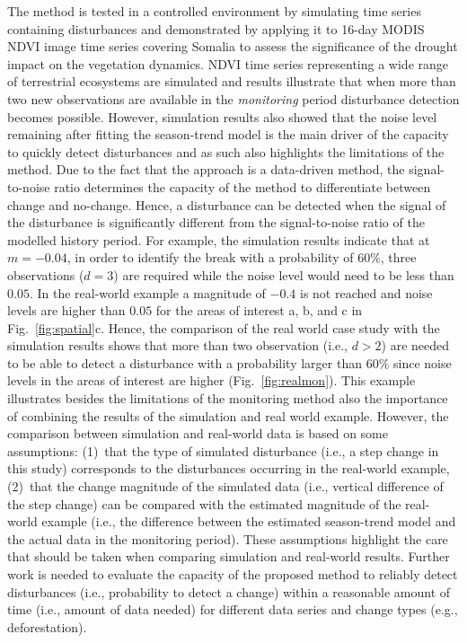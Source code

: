 \documentclass[authoryear,preprint,review,10pt]{elsarticle}
\begin{document}
The method is tested in a controlled environment by simulating time series containing disturbances and demonstrated by applying it to 16-day MODIS NDVI image
time series covering Somalia to assess the significance of the drought impact on the vegetation dynamics. NDVI time series representing a wide range of
terrestrial ecosystems are simulated and results illustrate that when more than two new observations are available in the \emph{monitoring} period
disturbance detection becomes possible. However, simulation results also showed that the noise level remaining after fitting the season-trend model is the
main driver of the capacity to quickly detect disturbances and as such also highlights the limitations of the method. Due to the fact that the approach is a
data-driven method, the signal-to-noise ratio determines the capacity of the method to differentiate between change and no-change. Hence, a disturbance can
be detected when the signal of the disturbance is significantly different from the signal-to-noise ratio of the modelled history period. For example, the
simulation results indicate that at $m = -0.04$, in order to identify the break with a probability of $60\%$, three observations ($d=3$) are required while
the noise level would need to be less than $0.05$. In the real-world example a magnitude of $-0.4$ is not reached and noise levels are higher than $0.05$ for
the areas of interest a, b, and c in Fig.~\ref{fig:spatial}c. Hence, the comparison of the real world case study with the simulation results shows that more
than two observation (i.e., $d>2$) are needed to be able to detect a disturbance with a probability larger than $60\%$ since noise levels in the areas of
interest are higher (Fig.~\ref{fig:realmon}).  This example illustrates besides the limitations of the monitoring method also the importance of combining the
results of the simulation and real world example. However, the comparison between simulation and real-world data is based on some assumptions: (1)~that the
type of simulated disturbance (i.e., a step change in this study) corresponds to the disturbances occurring in the real-world example,  (2)~that the change
magnitude of the simulated data (i.e., vertical difference of the step change) can be compared with the estimated magnitude of the real-world example (i.e.,
the difference between the estimated season-trend model and the actual data in the monitoring period). These assumptions highlight the care that should be
taken when comparing simulation and real-world results.  Further work is needed to evaluate the capacity of the proposed method to reliably detect
disturbances (i.e., probability to detect a change) within a reasonable amount of time (i.e., amount of data needed) for different data series and change
types (e.g., deforestation). 
\end{document}
